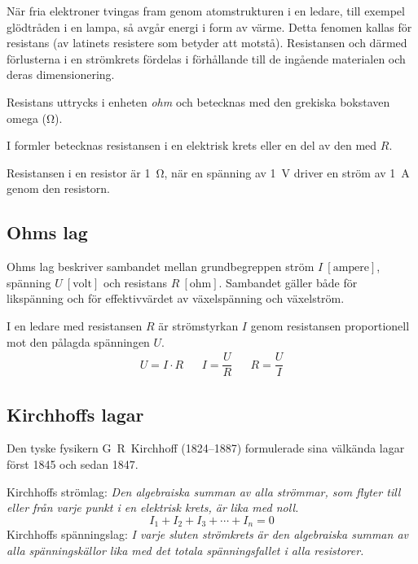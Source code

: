 När fria elektroner tvingas fram genom atomstrukturen i en ledare, till exempel
glödtråden i en lampa, så avgår energi i form av värme.
Detta fenomen kallas för resistans (av latinets resistere som betyder att
motstå).
Resistansen och därmed förlusterna i en strömkrets fördelas i
förhållande till de ingående materialen och deras dimensionering.

Resistans uttrycks i enheten \emph{ohm} \cite{SIbrochure8} och betecknas med
den grekiska bokstaven omega (\unit{\ohm}).

I formler betecknas resistansen i en elektrisk krets eller en del av den med
\(R\).

Resistansen i en resistor är \qty{1}{\ohm}, när en spänning av \qty{1}{\volt}
driver en ström av \qty{1}{\ampere} genom den resistorn.

\subsection{Ohms lag}
\label{ohms_lag}

Ohms lag beskriver sambandet mellan grundbegreppen ström
\(I\ \mathrm{[ampere]}\), spänning \(U\ \mathrm{[volt]}\) och resistans
\(R\ \mathrm{[ohm]}\).
Sambandet gäller både för likspänning och för effektivvärdet av växelspänning
och växelström.

I en ledare med resistansen \(R\) är strömstyrkan \(I\) genom resistansen
proportionell mot den pålagda spänningen \(U\).
\[
\begin{array}{lllll}U=I \cdot R & & I=\dfrac{U}{R} & & R=\dfrac{U}{I}\end{array}
\]
\subsection{Kirchhoffs lagar}

Den tyske fysikern G~R~Kirchhoff (1824--1887) formulerade sina välkända lagar
först 1845 och sedan 1847.

Kirchhoffs strömlag: \emph{Den algebraiska summan av alla strömmar, som flyter
till eller från varje punkt i en elektrisk krets, är lika med noll.}
\[I_1 + I_2 + I_3 + \cdots + I_n = 0\]
Kirchhoffs spänningslag: \emph{I varje sluten strömkrets är den algebraiska
summan av alla spänningskällor lika med det totala spänningsfallet i alla
resistorer.}

